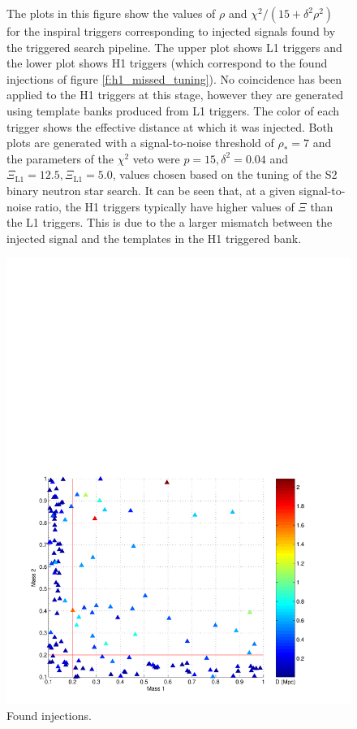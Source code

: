 \begin{figure}[p]
\caption[Illustration of Tuning Based on Injections]{%
\label{f:h1_inj_xi_tuning}
The plots in this figure show the values of $\rho$ and $\chi^2/(15 +
\delta^2\rho^2)$ for the inspiral triggers corresponding to injected signals
found by the triggered search pipeline. The upper plot shows L1 triggers and
the lower plot shows H1 triggers (which correspond to the found injections of
figure \ref{f:h1_missed_tuning}). No coincidence has been applied to the H1
triggers at this stage, however they are generated using template banks
produced from L1 triggers. The color of each trigger shows the effective
distance at which it was injected.  Both plots are generated with a
signal-to-noise threshold of $\rho_\ast = 7$ and the parameters of the
$\chi^2$ veto were $p = 15, \delta^2 = 0.04$ and $\Xi_\mathrm{L1} = 12.5,
\Xi_\mathrm{L1} = 5.0$, values chosen based on the tuning of the S2 binary
neutron star search. It can be seen that, at a given signal-to-noise ratio,
the H1 triggers typically have higher values of $\Xi$ than the L1 triggers.
This is due to the a larger mismatch between the injected signal and the
templates in the H1 triggered bank.
}
\end{figure}

\begin{figure}[p]
\begin{center}
\includegraphics[width=\textwidth]{figures/result/m1m2_missed}
\end{center}
\caption[Simulated Signals Not Detected by Pipeline]{%
\label{f:m1m2_missed}
Found injections.
}
\end{figure}

